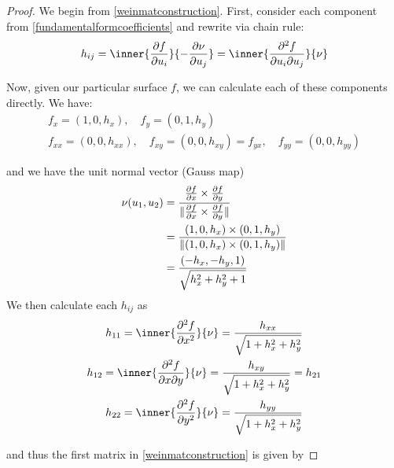        	\begin{proof}
       		We begin from \cref{weinmatconstruction}.
       		First, consider each component from \cref{fundamentalformcoefficients}
       		and rewrite via chain rule:
      		 \[ h_{ij} = \inner{\frac{\partial f}{\partial u_i}}{-\frac{\partial \nu}{\partial u_j}}
       		= \inner{\frac{\partial^2 f}{\partial u_i \partial u_j}}{\nu} \]
       		
       		Now, given our particular surface $f$, we can calculate each of these components directly. We have:
       		\begin{equation}
       		\begin{gathered}
       		f_{x} = (1, 0, h_x) , \quad
       		f_{y} = (0, 1, h_y)  \\
       		f_{xx} = (0, 0, h_{xx}) , \quad
       		f_{xy} = (0, 0, h_{xy}) = f_{yx} , \quad
       		f_{yy} = (0, 0, h_{yy})
       		\end{gathered}
       		\end{equation}
       		
       		and we have the unit normal vector (Gauss map)
       		\begin{align}
       		\nu(u_1, u_2) &=
       		\frac{\frac{\partial f}{\partial x} \times \frac{\partial f}{\partial y}}
       		{\Vert\frac{\partial f}{\partial x} \times \frac{\partial f}{\partial y}\Vert} \\
       		&= \frac{(1, 0, h_x) \times (0, 1, h_y)}{\Vert(1, 0, h_x) \times (0, 1, h_y)\Vert} \\
       		&= \frac{\left( -h_x , -h_y , 1 \right)}{\sqrt{h_x^2 + h_y^2 + 1}}
	 \end{align}
	 We then calculate each $h_{ij}$ as
	 \begin{equation}
	 \begin{gathered}
	 h_{11} = \inner{\frac{\partial^2 f}{\partial x^2}}{\nu} = 
		 \frac{h_{xx}}{\sqrt{1+h_x^2 + h_y^2}} \\
	  h_{12} = \inner{\frac{\partial^2 f}{\partial x \partial y}}{\nu} = 
	  \frac{h_{xy}}{\sqrt{1+h_x^2 + h_y^2}} = h_{21} \\
	  h_{22} = \inner{\frac{\partial^2 f}{\partial y^2}}{\nu} = 
	  \frac{h_{yy}}{\sqrt{1+h_x^2 + h_y^2}} \\
	 \end{gathered}
	 \end{equation}
	 
	 and thus the first matrix in \cref{weinmatconstruction} is given by
	 

\end{proof}
